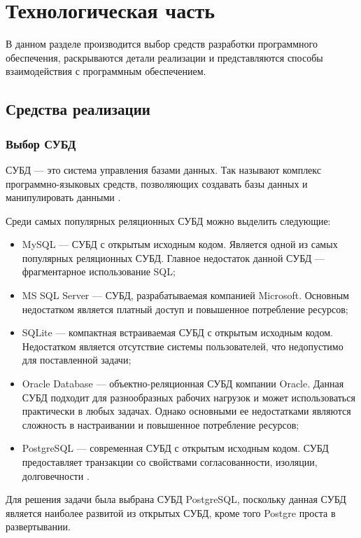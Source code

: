 \chapter{Технологическая часть}

В данном разделе производится выбор средств разработки программного обеспечения, раскрываются детали реализации и представляются способы взаимодействия с программным обеспечением.

\section{Средства реализации}

\subsection{Выбор СУБД}

СУБД --- это система управления базами данных. Так называют комплекс программно-языковых средств, позволяющих создавать базы данных и манипулировать данными \cite{bib:7}.

Среди самых популярных реляционных СУБД можно выделить следующие:

\begin{itemize}
	\item MySQL --- СУБД с открытым исходным кодом. Является одной из самых популярных реляционных СУБД. Главное недостаток данной СУБД --- фрагментарное использование SQL;
	\item MS SQL Server --- СУБД, разрабатываемая компанией Microsoft. Основным недостатком является платный доступ и повышенное потребление ресурсов;
 	\item SQLite --- компактная встраиваемая СУБД с открытым исходным кодом. Недостатком является отсутствие системы пользователей, что недопустимо для поставленной задачи;
  	\item Oracle Database --- объектно-реляционная СУБД компании Oracle. Данная СУБД подходит для разнообразных рабочих нагрузок и может использоваться практически в любых задачах. Однако основными ее недостатками являются сложность в настраивании и повышенное потребление ресурсов;
   \item PostgreSQL --- современная СУБД с открытым исходным кодом. СУБД предоставляет транзакции со свойствами согласованности, изоляции, долговечности \cite{bib:4}.
\end{itemize}

Для решения задачи была выбрана СУБД PostgreSQL, поскольку данная СУБД является наиболее развитой из открытых СУБД, кроме того Postgre проста в развертывании.

